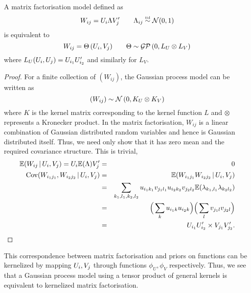 \begin{prop}
\label{prop:matrixfactorisation}
A matrix factorisation model defined as
\begin{equation}
W_{ij} = U_i\Lambda V_j' \quad \quad \Lambda_{ij} \overset{\mbox{\tiny iid}}{\sim} \mathcal{N} (0, 1)
\end{equation}
is equivalent to
\begin{equation}
W_{ij} = \Theta\,(U_i, V_j) \quad \quad \Theta \sim \mathcal{GP}\,(0, L_U \otimes L_V)
\end{equation}
where $L_U(U_i, U_j) = U_{i_1}U_{i_2}'$ and similarly for $L_V$.
\end{prop}

\begin{proof}
For a finite collection of $(W_{ij})$, the Gaussian process model can be written as
\begin{equation}
(W_{ij}) \sim \mathcal{N}\,(0, K_U \otimes K_V)
\end{equation}
where $K$ is the kernel matrix corresponding to the kernel function $L$ and $\otimes$ represents a Kronecker product.
In the matrix factorisation, $W_{ij}$ is a linear combination of Gaussian distributed random variables and hence is Gaussian distributed itself. Thus, we need only show that it has zero mean and the required covariance structure. This is trivial,
\begin{eqnarray}
\mathbb{E} (W_{ij} \,|\, U_i, V_j) = U_i\mathbb{E}(\Lambda)V_j' & = & 0 \\
\textrm{Cov} (W_{i_1j_1}, W_{i_2j_2} \,|\, U_i, V_j) & = & \mathbb{E} (W_{i_1j_1} W_{i_2j_2} \,|\, U_i, V_j ) \nonumber \\
& = & \sum_{k_1,l_1,k_2,l_2} u_{i_1k_1}v_{j_1l_1}u_{i_2k_2}v_{j_2l_2}\mathbb{E}(\lambda_{k_1,l_1}\lambda_{k_2l_2}) \nonumber \\
& = & \Big(\sum_k u_{i_1k}u_{i_2k}\Big)\Big(\sum_l v_{j_1l}v_{j_2l}\Big) \nonumber \\
& = & U_{i_1}U_{i_2}' \times V_{j_1}V_{j_2}'.
\end{eqnarray}
\end{proof}

This correspondence between matrix factorisation and priors on functions can be kernelized by mapping $U_i, V_j$ through functions $\phi_U, \phi_V$ respectively.
Thus, we see that a Gaussian process model using a tensor product of general kernels is equivalent to kernelized matrix factorisation.

